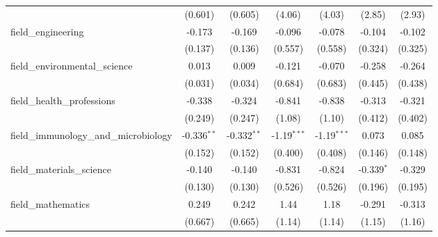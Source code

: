 \begin{tabular}{lcccccc}
                                                               & (0.601)        & (0.605)        & (4.06)         & (4.03)         & (2.85)         & (2.93)\\   
   field\_engineering                                          & -0.173         & -0.169         & -0.096         & -0.078         & -0.104         & -0.102\\   
                                                               & (0.137)        & (0.136)        & (0.557)        & (0.558)        & (0.324)        & (0.325)\\   
   field\_environmental\_science                               & 0.013          & 0.009          & -0.121         & -0.070         & -0.258         & -0.264\\   
                                                               & (0.031)        & (0.034)        & (0.684)        & (0.683)        & (0.445)        & (0.438)\\   
   field\_health\_professions                                  & -0.338         & -0.324         & -0.841         & -0.838         & -0.313         & -0.321\\   
                                                               & (0.249)        & (0.247)        & (1.08)         & (1.10)         & (0.412)        & (0.402)\\   
   field\_immunology\_and\_microbiology                        & -0.336$^{**}$  & -0.332$^{**}$  & -1.19$^{***}$  & -1.19$^{***}$  & 0.073          & 0.085\\   
                                                               & (0.152)        & (0.152)        & (0.400)        & (0.408)        & (0.146)        & (0.148)\\   
   field\_materials\_science                                   & -0.140         & -0.140         & -0.831         & -0.824         & -0.339$^{*}$   & -0.329\\   
                                                               & (0.130)        & (0.130)        & (0.526)        & (0.526)        & (0.196)        & (0.195)\\   
   field\_mathematics                                          & 0.249          & 0.242          & 1.44           & 1.18           & -0.291         & -0.313\\   
                                                               & (0.667)        & (0.665)        & (1.14)         & (1.14)         & (1.15)         & (1.16)\\   

\end{tabular}
